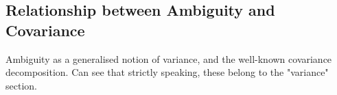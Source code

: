 \documentclass[../main.tex]{subfiles}
\begin{document}


\subsection{Relationship between Ambiguity and Covariance}

Ambiguity as a generalised notion of variance, and the well-known covariance decomposition.  Can see that strictly speaking, these belong to the "variance" section.
\end{document}
